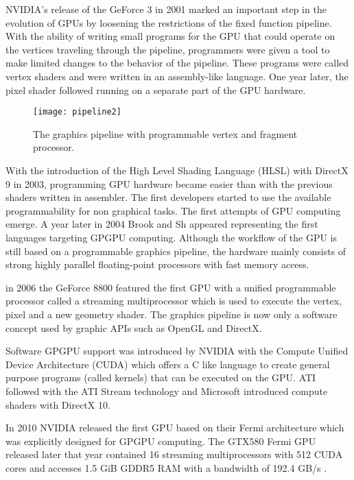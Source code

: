NVIDIA's release of the GeForce 3 in 2001 marked an important step in the evolution of GPUs by loosening the restrictions of the fixed function pipeline. With the ability of writing small programs for the GPU that could operate on the vertices traveling through the pipeline, programmers were given a tool to make limited changes to the behavior of the pipeline. These programs were called vertex shaders and were written in an assembly-like language. One year later, the pixel shader followed running on a separate part of the GPU hardware.

\begin{figure} %
\centering
\texttt{[image: pipeline2]}
\caption{The graphics pipeline with programmable vertex and fragment processor. \cite{cg_book}}
\label{fig:pipeline2}
\end{figure}

With the introduction of the High Level Shading Language (HLSL) with DirectX 9 in 2003, programming GPU hardware became easier than with the previous shaders written in assembler. The first developers started to use the available programmability for non graphical tasks. The first attempts of GPU computing emerge. A year later in 2004 Brook and Sh appeared representing the first languages targeting GPGPU computing.
Although the workflow of the GPU is still based on a programmable graphics pipeline, the hardware mainly consists of strong highly parallel floating-point processors with fast memory access.

in 2006 the GeForce 8800 featured the first GPU with a unified programmable processor called a streaming multiprocessor which is used to execute the vertex, pixel and a new geometry shader. The graphics pipeline is now only a software concept used by graphic APIs such as OpenGL and DirectX.

Software GPGPU support was introduced by NVIDIA with the Compute Unified Device Architecture (CUDA) which offers a C like language to create general purpose programs (called kernels) that can be executed on the GPU. ATI followed with the ATI Stream technology and Microsoft introduced compute shaders with DirectX 10.

In 2010 NVIDIA released the first GPU based on their Fermi architecture which was explicitly designed for GPGPU computing. The GTX580 Fermi GPU released later that year contained 16 streaming multiprocessors with 512 CUDA cores and accesses 1.5 GiB GDDR5 RAM with a bandwidth of 192.4 GB/s \cite{gtx580_spec}.

